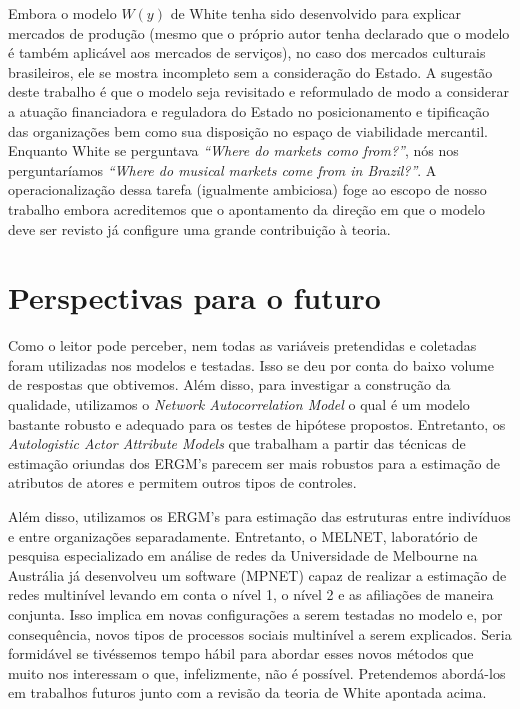 \documentclass[a4paper, 12pt, openright, oneside, german, french, english, brazil]{abntex2}
\begin{document}
        Embora o modelo $W(y)$ de White tenha sido desenvolvido para explicar mercados de produção (mesmo que o próprio autor tenha declarado que o modelo é também aplicável aos mercados de serviços), no caso dos mercados culturais brasileiros,  ele se mostra incompleto sem a consideração do Estado. A sugestão deste trabalho é que o modelo seja revisitado e reformulado de modo a considerar a atuação financiadora e reguladora do Estado no posicionamento e tipificação das organizações bem como sua disposição no espaço de viabilidade mercantil. Enquanto White se perguntava \textit{``Where do markets como from?''}, nós nos perguntaríamos \textit{``Where do musical markets come from in Brazil?''}. A operacionalização dessa tarefa (igualmente ambiciosa) foge ao escopo de nosso trabalho embora acreditemos que o apontamento da direção em que o modelo deve ser revisto já configure uma grande contribuição à teoria.


	\section{Perspectivas para o futuro}
	
	Como o leitor pode perceber, nem todas as variáveis pretendidas e coletadas foram utilizadas nos modelos e testadas. Isso se deu por conta do baixo volume de respostas que obtivemos. Além disso, para investigar a construção da qualidade, utilizamos o \textit{Network Autocorrelation Model} o qual é um modelo bastante robusto e adequado para os testes de hipótese propostos. Entretanto, os \textit{Autologistic Actor Attribute Models} que trabalham a partir das técnicas de estimação oriundas dos ERGM's parecem ser mais robustos para a estimação de atributos de atores e permitem outros tipos de controles. 
	
	Além disso, utilizamos os ERGM's para estimação das estruturas entre indivíduos e entre organizações separadamente. Entretanto, o MELNET, laboratório de pesquisa especializado em análise de redes da Universidade de Melbourne na Austrália já desenvolveu um software (MPNET) capaz de realizar a estimação de redes multinível levando em conta o nível 1, o nível 2 e as afiliações de maneira conjunta. Isso implica em novas configurações a serem testadas no modelo e, por consequência, novos tipos de processos sociais multinível a serem explicados. Seria formidável se tivéssemos tempo hábil para abordar esses novos métodos que muito nos interessam o que, infelizmente, não é possível. Pretendemos abordá-los em trabalhos futuros junto com a revisão da teoria de White apontada acima.
\end{document}
